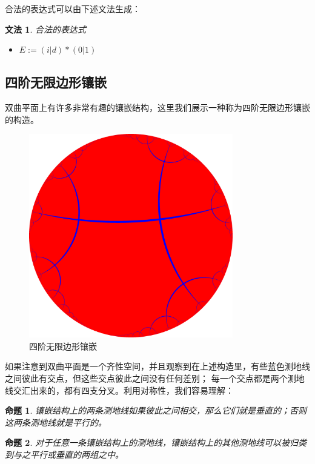 \documentclass[a4paper,12pt]{article}
\newtheorem{proposition}{命题}
\newtheorem{grammar}{文法}
\begin{document}
合法的表达式可以由下述文法生成：

\begin{grammar}
\label{g1}
合法的表达式
\begin{itemize}
\item $E := (i | d)* (0 | 1)$
\end{itemize}
\end{grammar}

\newpage

\subsection{四阶无限边形镶嵌}

双曲平面上有许多非常有趣的镶嵌结构，这里我们展示一种称为四阶无限边形镶嵌的构造。

\begin{figure}[ht]
\centering
\includegraphics[width=3.5in]{images/H2_tiling_24i-1.png}
\caption{四阶无限边形镶嵌}
\end{figure}

如果注意到双曲平面是一个齐性空间，并且观察到在上述构造里，有些蓝色测地线之间彼此有交点，但这些交点彼此之间没有任何差别；
每一个交点都是两个测地线交汇出来的，都有四支分叉。利用对称性，我们容易理解：

\begin{proposition}
\label{A}
镶嵌结构上的两条测地线如果彼此之间相交，那么它们就是垂直的；否则这两条测地线就是平行的。
\end{proposition}

\begin{proposition}
\label{B}
对于任意一条镶嵌结构上的测地线，镶嵌结构上的其他测地线可以被归类到与之平行或垂直的两组之中。
\end{proposition}
\end{document}
